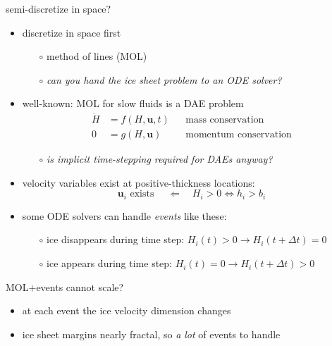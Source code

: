 \documentclass[hide notes,intlimits,usenames,dvipsnames]{beamer}
\begin{document}
\begin{frame}{semi-discretize in space?}

\begin{itemize}
\item discretize in space first
    \begin{itemize}
    \item[$\circ$] method of lines (MOL)
    \item[$\circ$] \emph{can you hand the ice sheet problem to an ODE solver?}
    \end{itemize}
\item well-known: MOL for slow fluids is a DAE problem
\begin{align*}
\dot H &= f(H,\mathbf{u},t) && \text{mass conservation} \\
     0 &= g(H,\mathbf{u})   && \text{momentum conservation}
\end{align*}
\vspace{-5mm}
    \begin{itemize}
    \item[$\circ$] \emph{is implicit time-stepping required for DAEs anyway?}
    \end{itemize}
\item velocity variables exist at positive-thickness locations:
    $$\mathbf{u}_i \text{ exists } \quad \Longleftarrow \quad H_i > 0 \iff h_i > b_i$$
\item some ODE solvers can handle \emph{events} like these:
    \begin{itemize}
    \item[$\circ$] ice disappears during time step:  $H_i(t)>0 \to H_i(t+\Delta t)=0$
    \item[$\circ$] ice appears during time step:  $H_i(t)=0 \to H_i(t+\Delta t)>0$
    \end{itemize}
\end{itemize}
\end{frame}


\begin{frame}{MOL$+$events cannot scale?}

\begin{center}

\end{center}

\vspace{-6mm}
\begin{itemize}
\item at each event the ice velocity dimension changes
\item ice sheet margins nearly fractal, so \emph{a lot} of events to handle
\end{itemize}
\end{frame}
\end{document}
